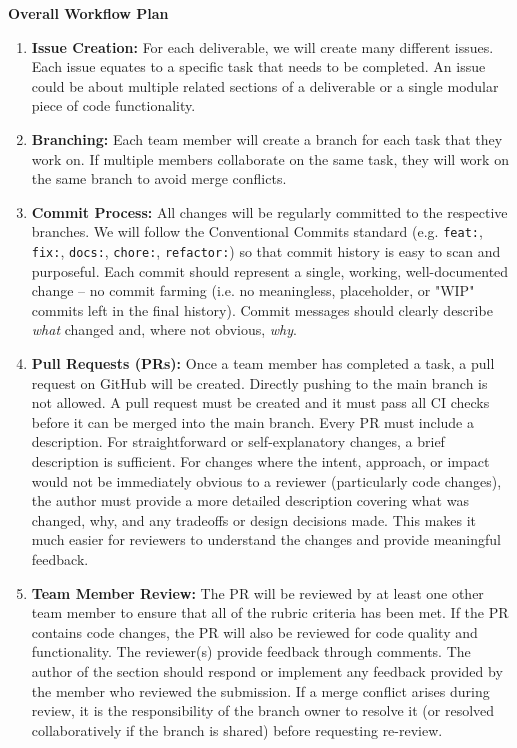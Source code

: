 \documentclass{article}
\begin{document}
\begin{itemize}
          \textbf{Overall Workflow Plan}
          \begin{enumerate}
              \item \textbf{Issue Creation:} For each deliverable, we will create many different issues. Each issue equates to a specific task that needs to be completed. An issue could be about multiple related sections of a deliverable or a single modular piece of code functionality.
              \item \textbf{Branching:} Each team member will create a branch for each task that they work on. If multiple members
                    collaborate on the same task, they will work on the same branch to avoid merge conflicts.
              \item \textbf{Commit Process:} All changes will be regularly committed to the respective branches. We will follow the Conventional Commits standard (e.g. \texttt{feat:}, \texttt{fix:}, \texttt{docs:}, \texttt{chore:}, \texttt{refactor:}) so that commit history is easy to scan and purposeful. Each commit should represent a single, working, well-documented change -- no commit farming (i.e. no meaningless, placeholder, or "WIP" commits left in the final history). Commit messages should clearly describe \emph{what} changed and, where not obvious, \emph{why}.
              \item \textbf{Pull Requests (PRs):} Once a team member has completed a task, a pull request on GitHub will be created. Directly pushing to the main branch is not allowed.
                    A pull request must be created and it must pass all CI checks before it can be merged into the main branch.
                    Every PR must include a description. For straightforward or self-explanatory changes, a brief description is sufficient. For changes where the intent, approach, or impact would not be immediately obvious to a reviewer (particularly code changes), the author must provide a more detailed description covering what was changed, why, and any tradeoffs or design decisions made. This makes it much easier for reviewers to understand the changes and provide meaningful feedback.
              \item \textbf{Team Member Review:} The PR will be reviewed by at least one other team member to ensure that all of the rubric criteria has been met.
                    If the PR contains code changes, the PR will also be reviewed for code quality and functionality. The reviewer(s) provide feedback through comments. The author
                    of the section should respond or implement any feedback provided by the member who reviewed the submission. If a merge conflict arises during review, it is the responsibility of the branch owner to resolve it (or resolved collaboratively if the branch is shared) before requesting re-review.

\end{enumerate}
\end{itemize}
\end{document}
